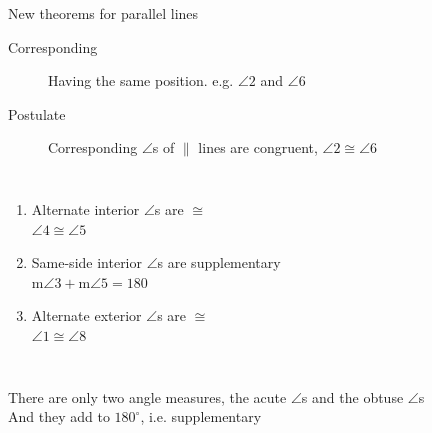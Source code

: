 \documentclass[onlytextwidth, aspectratio=169]{beamer}
\begin{document}
\begin{frame}{New theorems for parallel lines}
  \begin{description}
    \item[Corresponding]  Having the same position. e.g. $\angle 2$ and $\angle 6$
    \item[Postulate] Corresponding $\angle$s of $\parallel$ lines are congruent, 
    $\angle 2 \cong \angle 6$
  \end{description} \bigskip
    \begin{columns}
      \begin{enumerate}
        \item Alternate interior  $\angle$s are $\cong$\\
        $\angle 4 \cong \angle 5$
        \item Same-side interior $\angle$s are supplementary\\
        m$\angle 3 + \text{m}\angle 5 =  180$
        \item Alternate exterior  $\angle$s are $\cong$\\
        $\angle 1 \cong \angle 8$
      \end{enumerate}
    \end{columns} \vspace{0.7cm}
    There are only two angle measures, the acute $\angle$s and the obtuse $\angle$s \\
    And they add to $180^\circ$, i.e. supplementary
  \end{frame}
\end{document}
